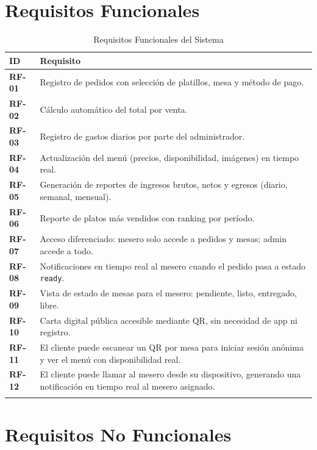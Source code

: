 \section{Requisitos Funcionales}

\begin{longtable}{>{\bfseries}p{1.5cm} p{11cm}}
  \toprule
  \textbf{ID} & \textbf{Requisito} \\
  \midrule
  \endhead
  RF-01 & Registro de pedidos con selección de platillos, mesa y método de pago. \\[3pt]
  RF-02 & Cálculo automático del total por venta. \\[3pt]
  RF-03 & Registro de gastos diarios por parte del administrador. \\[3pt]
  RF-04 & Actualización del menú (precios, disponibilidad, imágenes) en tiempo real. \\[3pt]
  RF-05 & Generación de reportes de ingresos brutos, netos y egresos (diario, semanal, mensual). \\[3pt]
  RF-06 & Reporte de platos más vendidos con ranking por período. \\[3pt]
  RF-07 & Acceso diferenciado: mesero solo accede a pedidos y mesas; admin accede a todo. \\[3pt]
  RF-08 & Notificaciones en tiempo real al mesero cuando el pedido pasa a estado \texttt{ready}. \\[3pt]
  RF-09 & Vista de estado de mesas para el mesero: pendiente, listo, entregado, libre. \\[3pt]
  RF-10 & Carta digital pública accesible mediante QR, sin necesidad de app ni registro. \\[3pt]
  RF-11 & El cliente puede escanear un QR por mesa para iniciar sesión anónima y ver el menú con disponibilidad real. \\[3pt]
  RF-12 & El cliente puede llamar al mesero desde su dispositivo, generando una notificación en tiempo real al mesero asignado. \\
  \bottomrule
  \caption{Requisitos Funcionales del Sistema}
\end{longtable}

\section{Requisitos No Funcionales}

